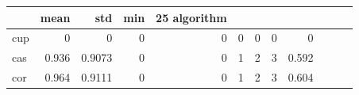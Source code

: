 \begin{tabular}{lrrrrrrrr}
\toprule
 & mean & std & min & 25%
algorithm &  &  &  &  &  &  &  &  \\
\midrule
cup & 0 & 0 & 0 & 0 & 0 & 0 & 0 & 0 \\
cas & 0.936 & 0.9073 & 0 & 0 & 1 & 2 & 3 & 0.592 \\
cor & 0.964 & 0.9111 & 0 & 0 & 1 & 2 & 3 & 0.604 \\
\bottomrule
\end{tabular}
